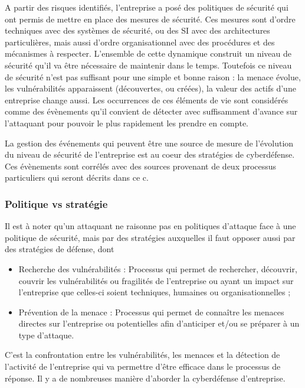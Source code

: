 A partir des risques identifiés, l’entreprise a posé des politiques de sécurité qui ont permis de mettre en place des mesures de sécurité. Ces mesures sont d’ordre techniques avec des systèmes de sécurité, ou des SI avec des architectures particulières, mais aussi d’ordre organisationnel avec des procédures et des mécanismes à respecter.
L’ensemble de cette dynamique construit un niveau de sécurité qu’il va être nécessaire de maintenir dans le temps. Toutefois ce niveau de sécurité n’est pas suffisant pour une simple et bonne raison : la menace évolue, les vulnérabilités apparaissent (découvertes, ou créées), la valeur des actifs d’une entreprise change aussi. 
Les occurrences de ces éléments de vie sont considérés comme des évènements qu’il convient de détecter avec suffisamment d’avance sur l’attaquant pour pouvoir le plus rapidement les prendre en compte.

La gestion des événements qui peuvent être une source de mesure de l’évolution du niveau de sécurité de l’entreprise est au coeur des stratégies de cyberdéfense. Ces évènements sont corrélés avec des sources provenant de deux processus particuliers qui seront décrits dans ce c\edoc.

\begin{frame}
\frametitle<presentation>{Politique vs stratégie}
Il est à noter qu'un attaquant ne raisonne pas en politiques d'attaque face à une politique de sécurité, mais par des stratégies auxquelles il faut opposer aussi par des stratégies de défense, dont 

\begin{itemize}
\item Recherche des vulnérabilités : Processus qui permet de rechercher, découvrir, couvrir les vulnérabilités ou fragilités de l’entreprise ou ayant un impact sur l’entreprise que celles-ci soient techniques, humaines ou organisationnelles ;
\item Prévention de la menace : Processus qui permet de connaître les menaces directes sur l’entreprise ou potentielles afin d’anticiper et/ou se préparer à un type d’attaque.
\end{itemize}
\end{frame}

C’est la confrontation entre les vulnérabilités, les menaces et la détection de l’activité de l’entreprise qui va permettre d’être efficace dans le processus de réponse. Il y a de nombreuses manière d’aborder la cyberdéfense d’entreprise.

